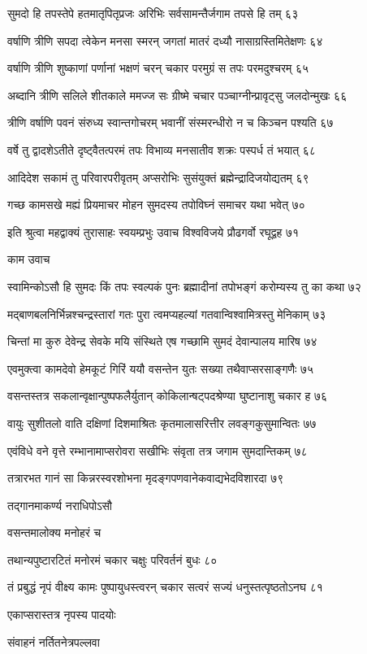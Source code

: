 सुमदो हि तपस्तेपे हतमातृपितृप्रजः
अरिभिः सर्वसामन्तैर्जगाम तपसे हि तम् ६३

वर्षाणि त्रीणि सपदा त्वेकेन मनसा स्मरन्
जगतां मातरं दध्यौ नासाग्रस्तिमितेक्षणः ६४

वर्षाणि त्रीणि शुष्काणां पर्णानां भक्षणं चरन्
चकार परमुग्रं स तपः परमदुश्चरम् ६५

अब्दानि त्रीणि सलिले शीतकाले ममज्ज सः
ग्रीष्मे चचार पञ्चाग्नीन्प्रावृट्सु जलदोन्मुखः ६६

त्रीणि वर्षाणि पवनं संरुध्य स्वान्तगोचरम्
भवानीं संस्मरन्धीरो न च किञ्चन पश्यति ६७

वर्षे तु द्वादशेऽतीते दृष्ट्वैतत्परमं तपः
विभाव्य मनसातीव शक्रः पस्पर्ध तं भयात् ६८

आदिदेश सकामं तु परिवारपरीवृतम्
अप्सरोभिः सुसंयुक्तं ब्रह्मेन्द्रादिजयोद्यतम् ६९

गच्छ कामसखे मह्यं प्रियमाचर मोहन
सुमदस्य तपोविघ्नं समाचर यथा भवेत् ७०

इति श्रुत्वा महद्वाक्यं तुरासाहः स्वयम्प्रभुः
उवाच विश्वविजये प्रौढगर्वो रघूद्वह ७१

काम उवाच

स्वामिन्कोऽसौ हि सुमदः किं तपः स्वल्पकं पुनः
ब्रह्मादीनां तपोभङ्गं करोम्यस्य तु का कथा ७२

मद्बाणबलनिर्भिन्नश्चन्द्रस्तारां गतः पुरा
त्वमप्यहल्यां गतवान्विश्वामित्रस्तु मेनिकाम् ७३

चिन्तां मा कुरु देवेन्द्र सेवके मयि संस्थिते
एष गच्छामि सुमदं देवान्पालय मारिष ७४

एवमुक्त्वा कामदेवो हेमकूटं गिरिं ययौ
वसन्तेन युतः सख्या तथैवाप्सरसाङ्गणैः ७५

वसन्तस्तत्र सकलान्वृक्षान्पुष्पफलैर्युतान्
कोकिलान्षट्पदश्रेण्या घुष्टानाशु चकार ह ७६

वायुः सुशीतलो वाति दक्षिणां दिशमाश्रितः
कृतमालासरित्तीर लवङ्गकुसुमान्वितः ७७

एवंविधे वने वृत्ते रम्भानामाप्सरोवरा
सखीभिः संवृता तत्र जगाम सुमदान्तिकम् ७८

तत्रारभत गानं सा किन्नरस्वरशोभना
मृदङ्गपणवानेकवाद्यभेदविशारदा ७९

तद्गानमाकर्ण्य नराधिपोऽसौ

वसन्तमालोक्य मनोहरं च

तथान्यपुष्टारटितं मनोरमं
चकार चक्षुः परिवर्तनं बुधः ८०

तं प्रबुद्धं नृपं वीक्ष्य कामः पुष्पायुधस्त्वरन्
चकार सत्वरं सज्यं धनुस्तत्पृष्ठतोऽनघ ८१

एकाप्सरास्तत्र नृपस्य पादयोः

संवाहनं नर्तितनेत्रपल्लवा

